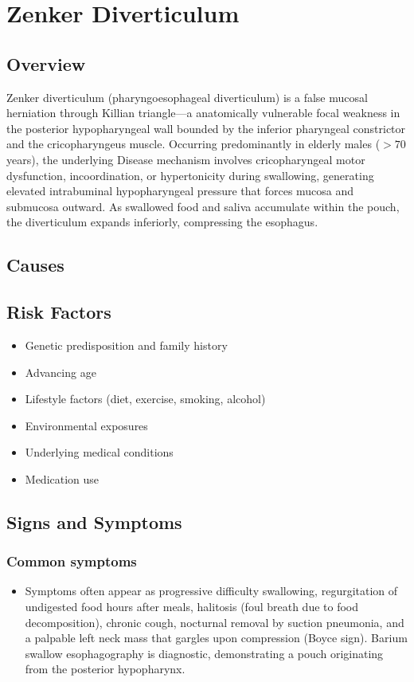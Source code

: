 \chapter{Zenker Diverticulum}
\label{sec:Zenker Diverticulum}

\section{Overview}
Zenker diverticulum (pharyngoesophageal diverticulum) is a false mucosal herniation through Killian triangle---a anatomically vulnerable focal weakness in the posterior hypopharyngeal wall bounded by the inferior pharyngeal constrictor and the cricopharyngeus muscle. Occurring predominantly in elderly males ($>70$ years), the underlying Disease mechanism involves cricopharyngeal motor dysfunction, incoordination, or hypertonicity during swallowing, generating elevated intrabuminal hypopharyngeal pressure that forces mucosa and submucosa outward. As swallowed food and saliva accumulate within the pouch, the diverticulum expands inferiorly, compressing the esophagus.
\section{Causes}
\section{Risk Factors}

\begin{itemize}[noitemsep]
  \item Genetic predisposition and family history
  \item Advancing age
  \item Lifestyle factors (diet, exercise, smoking, alcohol)
  \item Environmental exposures
  \item Underlying medical conditions
  \item Medication use
\end{itemize}
\section{Signs and Symptoms}

\subsection{Common symptoms}
\begin{itemize}[noitemsep]
  \item Symptoms often appear as progressive difficulty swallowing, regurgitation of undigested food hours after meals, halitosis (foul breath due to food decomposition), chronic cough, nocturnal removal by suction pneumonia, and a palpable left neck mass that gargles upon compression (Boyce sign). Barium swallow esophagography is diagnostic, demonstrating a pouch originating from the posterior hypopharynx. 
  \end{itemize}

